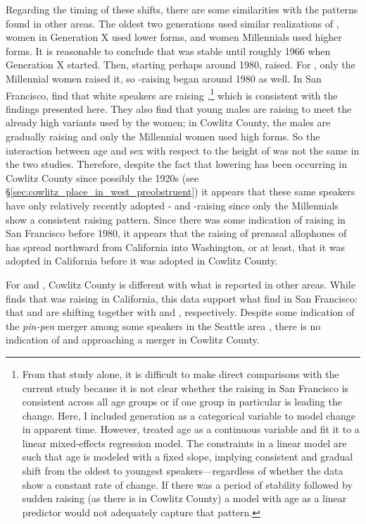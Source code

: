 Regarding the timing of these shifts, there are some similarities with the patterns found in other areas. The oldest two generations used similar realizations of \ban, women in Generation X used lower forms, and women Millennials used higher forms. It is reasonable to conclude that \ban was stable until roughly 1966 when Generation X started. Then, starting perhaps around 1980, \ban raised. For \bang, only the Millennial women raised it, so \bang-raising began around 1980 as well. In San Francisco, \citet{cardoso_etal_2016_pads} find that white speakers are raising \ban,\footnote{From that study alone, it is difficult to make direct comparisons with the current study because it is not clear whether the raising in San Francisco is consistent across all age groups or if one group in particular is leading the change. Here, I included generation as a categorical variable to model change in apparent time. However, \citet{cardoso_etal_2016_pads} treated age as a continuous variable and fit it to a linear mixed-effects regression model. The constraints in a linear model are such that age is modeled with a fixed slope, implying consistent and gradual shift from the oldest to youngest speakers---regardless of whether the data show a constant rate of change. If there was a period of stability followed by sudden raising (as there is in Cowlitz County) a model with age as a linear predictor would not adequately capture that pattern.} which is consistent with the findings presented here. They also find that young males are raising \bang to meet the already high variants used by the women; in Cowlitz County, the males are gradually raising \bang and only the Millennial women used high forms. So the interaction between age and sex with respect to the height of \bang was not the same in the two studies. Therefore, despite the fact that \bat lowering has been occurring in Cowlitz County since possibly the 1920s (see \S\ref{sec:cowlitz_place_in_west_preobstruent}) it appears that these same speakers have only relatively recently adopted \ban- and \bang-raising since only the Millennials show a consistent raising pattern. Since there was some indication of raising in San Francisco before 1980, it appears that the raising of prenasal allophones of \trap has spread northward from California into Washington, or at least, that it was adopted in California before it was adopted in Cowlitz County.

For \ben and \bin, Cowlitz County is different with what is reported in other areas. While  \citet{holland_2014_diss} finds that \ben was raising in California, this data support what \citet{cardoso_etal_2016_pads} find in San Francisco: that \ben and \bin are shifting together with \bet and \bit, respectively. Despite some indication of the \textit{pin-pen} merger among some speakers in the Seattle area \citep{scanlon_wassink_2010}, there is no indication of \bin and \ben approaching a merger in Cowlitz County.

